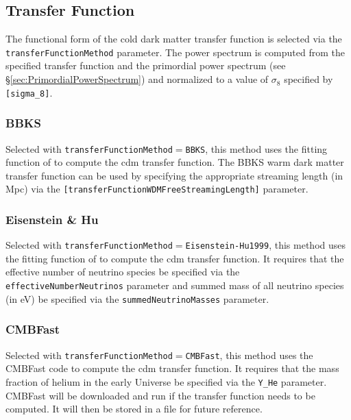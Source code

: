 \subsection{Transfer Function}\label{sec:TransferFunction}

The functional form of the cold dark matter transfer function is selected via the {\tt transferFunctionMethod} parameter. The power spectrum is computed from the specified transfer function and the primordial power spectrum (see \S\ref{sec:PrimordialPowerSpectrum}) and normalized to a value of $\sigma_8$ specified by {\tt [sigma\_8]}.

\subsubsection{BBKS}

Selected with {\tt transferFunctionMethod}$=${\tt BBKS}, this method uses the fitting function of \cite{bardeen_statistics_1986} to compute the \gls{cdm} transfer function. The BBKS warm dark matter transfer function can be used by specifying the appropriate streaming length (in Mpc) via the {\tt [transferFunctionWDMFreeStreamingLength]} parameter.

\subsubsection{Eisenstein \& Hu}

Selected with {\tt transferFunctionMethod}$=${\tt Eisenstein-Hu1999}, this method uses the fitting function of \cite{eisenstein_power_1999} to compute the \gls{cdm} transfer function. It requires that the effective number of neutrino species be specified via the {\tt effectiveNumberNeutrinos} parameter and summed mass of all neutrino species (in eV) be specified via the {\tt summedNeutrinoMasses} parameter.

\subsubsection{{\sc CMBFast}}

Selected with {\tt transferFunctionMethod}$=${\tt CMBFast}, this method uses the {\sc CMBFast} code to compute the \gls{cdm} transfer function. It requires that the mass fraction of helium in the early Universe be specified via the {\tt Y\_He} parameter. {\sc CMBFast} will be downloaded and run if the transfer function needs to be computed. It will then be stored in a file for future reference.

